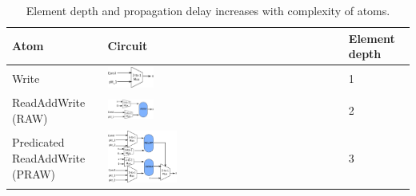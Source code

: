 \begin{table}[!t]
  \begin{scriptsize}
    \begin{tabular}{|p{}|p{}|p{}|}
  \hline
  Atom & Circuit & Element depth \\
  \hline
  Write & \includegraphics[width=0.2\textwidth]{rw.pdf} & 1 \\
  \hline
  ReadAddWrite (RAW) & \includegraphics[width=0.2\textwidth]{raw.pdf} & 2\\
  \hline
  \pbox{0.1\textwidth}
  {Predicated\\
  ReadAddWrite (PRAW)} & \includegraphics[width=0.3\textwidth]{pred_raw.pdf}  & 3\\
  \hline
  \end{tabular}
\end{scriptsize}
\caption{Element depth and propagation delay increases with complexity of atoms.}
  \label{fig:element_depth}
\end{table}

